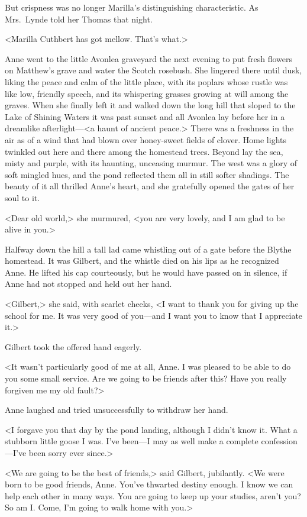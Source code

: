 But crispness was no longer Marilla's distinguishing characteristic. As Mrs.~Lynde told her Thomas that night.

<Marilla Cuthbert has got mellow. That's what.>

Anne went to the little Avonlea graveyard the next evening to put fresh flowers on Matthew's grave and water the Scotch rosebush. She lingered there until dusk, liking the peace and calm of the little place, with its poplars whose rustle was like low, friendly speech, and its whispering grasses growing at will among the graves. When she finally left it and walked down the long hill that sloped to the Lake of Shining Waters it was past sunset and all Avonlea lay before her in a dreamlike afterlight—<a haunt of ancient peace.> There was a freshness in the air as of a wind that had blown over honey-sweet fields of clover. Home lights twinkled out here and there among the homestead trees. Beyond lay the sea, misty and purple, with its haunting, unceasing murmur. The west was a glory of soft mingled hues, and the pond reflected them all in still softer shadings. The beauty of it all thrilled Anne's heart, and she gratefully opened the gates of her soul to it.

<Dear old world,> she murmured, <you are very lovely, and I am glad to be alive in you.>

Halfway down the hill a tall lad came whistling out of a gate before the Blythe homestead. It was Gilbert, and the whistle died on his lips as he recognized Anne. He lifted his cap courteously, but he would have passed on in silence, if Anne had not stopped and held out her hand.

<Gilbert,> she said, with scarlet cheeks, <I want to thank you for giving up the school for me. It was very good of you—and I want you to know that I appreciate it.>

Gilbert took the offered hand eagerly.

<It wasn't particularly good of me at all, Anne. I was pleased to be able to do you some small service. Are we going to be friends after this? Have you really forgiven me my old fault?>

Anne laughed and tried unsuccessfully to withdraw her hand.

<I forgave you that day by the pond landing, although I didn't know it. What a stubborn little goose I was. I've been—I may as well make a complete confession—I've been sorry ever since.>

<We are going to be the best of friends,> said Gilbert, jubilantly. <We were born to be good friends, Anne. You've thwarted destiny enough. I know we can help each other in many ways. You are going to keep up your studies, aren't you? So am I\@. Come, I'm going to walk home with you.>

